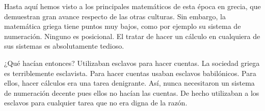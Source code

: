Hasta aquí hemos visto a los principales matemáticos de esta época en grecia, que demuestran gran avance respecto de las otras culturas. Sin embargo, la matemática griega tiene puntos muy bajos, como por ejemplo su sistema de numeración. Ninguno es posicional. El tratar de hacer un cálculo en cualquiera de sus sistemas es absolutamente tedioso. 

¿Qué hacían entonces? Utilizaban esclavos para hacer cuentas. La sociedad griega es terriblemente esclavista. Para hacer cuentas usaban esclavos babilónicos. Para ellos, hacer cálculos era una tarea denigrante. Así, nunca necesitaron un sistema de numeración decente pues ellos no hacían las cuentas. De hecho utilizaban a los esclavos para cualquier tarea que no era digna de la razón.